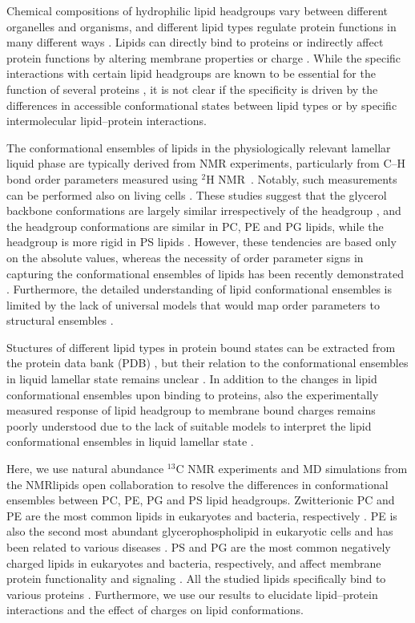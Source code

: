 \documentclass[aps,prl,superscriptaddress,twocolumn]{revtex4}
\begin{document}
Chemical compositions of hydrophilic lipid headgroups vary between different
organelles and organisms, and different lipid types
regulate protein functions in many different ways \cite{lee03,vanmeer08}.
Lipids can directly bind to proteins or indirectly affect protein
functions by altering membrane properties or charge \cite{lee03,lemmon08}.
While the specific interactions with certain lipid headgroups
are known to be essential for the function of several proteins \cite{lee11,lemmon08},
it is not clear if the specificity is driven by the differences in accessible
conformational states between lipid types or
by specific intermolecular lipid--protein interactions.

The conformational ensembles of lipids in the physiologically relevant lamellar liquid phase
are typically derived from NMR experiments, particularly from 
C--H bond order parameters measured using $^2$H NMR~\cite{seelig77c,davis83,Semchyschyn04}. Notably, such measurements can be performed also on living cells \cite{gally81,scherer87,seelig90}.
These studies suggest that the glycerol backbone conformations are largely similar irrespectively of the headgroup \cite{gally81}, 
and the headgroup conformations are similar in PC, PE and PG lipids, while the headgroup is more rigid in PS lipids \cite{wohlgemuth80,buldt81}. 
However, these tendencies are based only on the absolute values, whereas
the necessity of order parameter signs in capturing the conformational ensembles of lipids has been recently demonstrated \cite{botan15,ollila16,ferreira16}.
Furthermore, the detailed understanding of lipid conformational ensembles
is limited by the lack of universal models that would map order parameters to structural ensembles \cite{pezeshkian18,akutsu20}.

Stuctures of different lipid types in protein bound states can be extracted from the protein data bank (PDB) \cite{berman00},
but their relation to the conformational ensembles in liquid lamellar state remains unclear \cite{marsh13b}.
In addition to the changes in lipid conformational ensembles upon binding to proteins,
also the experimentally measured response of lipid headgroup to membrane bound charges remains poorly understood 
due to the lack of suitable models to interpret the lipid conformational ensembles in liquid lamellar state \cite{Semchyschyn04}.


Here, we use natural abundance $^{13}$C NMR experiments and MD simulations from the NMRlipids open collaboration
to resolve the differences in conformational ensembles between PC, PE, PG and PS lipid headgroups.
Zwitterionic PC and PE are the most common lipids in eukaryotes and bacteria, respectively \cite{vanmeer08,sohlenkamp16}.
PE is also the second most abundant glycerophospholipid in eukaryotic cells
and has been related to various diseases \cite{vance15,calzada16,patel17}.
PS and PG are the most common negatively charged lipids in eukaryotes and bacteria, respectively,
and affect membrane protein functionality and signaling \cite{lemmon08,leventis10,sohlenkamp16,hariharan18}.
All the studied lipids specifically bind to various proteins \cite{yeagle14}.
Furthermore, we use our results to elucidate lipid--protein interactions and the effect of charges on lipid conformations.
\end{document}
